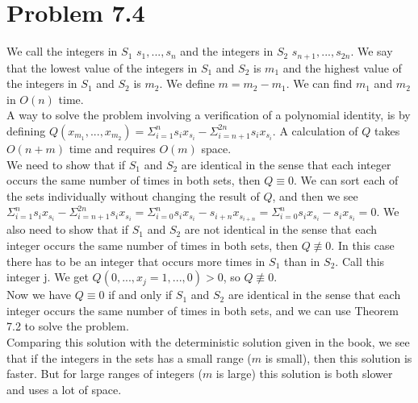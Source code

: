 \documentclass[12pt]{article}
\begin{document}
\section*{Problem 7.4}
We call the integers in $S_1$ $s_1,...,s_n$ and the integers in $S_2$ $s_{n+1},...,s_{2n}$. We say that the lowest value of the integers in $S_1$ and $S_2$ is $m_1$ and the highest value of the integers in $S_1$ and $S_2$ is $m_2$. We define $m=m_2-m_1$. We can find $m_1$ and $m_2$ in $O(n)$ time.\\
A way to solve the problem involving a verification of a polynomial identity, is by defining $Q(x_{m_1},...,x_{m_2})=\Sigma_{i=1}^ns_ix_{s_i}-\Sigma_{i=n+1}^{2n}s_ix_{s_i}$. A calculation of $Q$ takes $O(n+m)$ time and requires $O(m)$ space.\\
We need to show that if $S_1$ and $S_2$ are identical in the sense that each integer occurs the same number of times in both sets, then $Q\equiv0$. We can sort each of the sets individually without changing the result of $Q$, and then we see $\Sigma_{i=1}^ns_ix_{s_i}-\Sigma_{i=n+1}^{2n}s_ix_{s_i}=\Sigma_{i=0}^ns_ix_{s_i}-s_{i+n}x_{s_{i+n}}=\Sigma_{i=0}^ns_ix_{s_i}-s_ix_{s_i}=0$. We also need to show that if $S_1$ and $S_2$ are not identical in the sense that each integer occurs the same number of times in both sets, then $Q\not\equiv0$. In this case there has to be an integer that occurs more times in $S_1$ than in $S_2$. Call this integer j. We get $Q(0,...,x_j=1,...,0)>0$, so $Q\not\equiv0$.\\
Now we have $Q\equiv0$ if and only if $S_1$ and $S_2$ are identical in the sense that each integer occurs the same number of times in both sets, and we can use Theorem 7.2 to solve the problem.\\
Comparing this solution with the deterministic solution given in the book, we see that if the integers in the sets has a small range ($m$ is small), then this solution is faster. But for large ranges of integers ($m$ is large) this solution is both slower and uses a lot of space.
\end{document}
